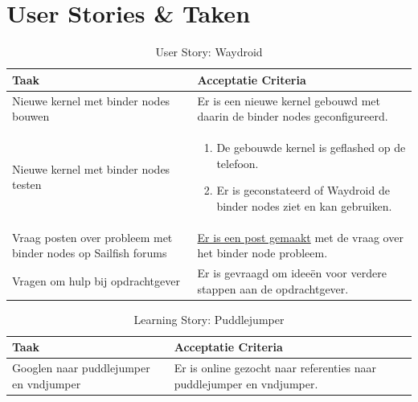 \documentclass[a4paper]{report}
\newcommand{\learningstorycolor}{PaleGreen1}
\newcommand{\userstorycolor}{PeachPuff1}
\begin{document}
\section{User Stories \& Taken}
\begin{tcolorbox}[colback=white, coltitle=black, colframe=\userstorycolor, title=\textbf{User Story: }Als developer wil ik Waydroid als package kunnen bouwen\, zodat er android apps op de telefoon gerund kunnen worden.]
  \begin{table}[H]
      \centering
    \begin{tabularx}{1\textwidth}{|X|X|}
      \hline
      \cellcolor[HTML]{ffcc99} \textbf{Taak} & \cellcolor[HTML]{ffcc99} \textbf{Acceptatie Criteria} \\ 
      \hline 
      Nieuwe kernel met binder nodes bouwen & Er is een nieuwe kernel gebouwd met daarin de binder nodes geconfigureerd. \\
      \hline
      Nieuwe kernel met binder nodes testen &  
      \begin{enumerate}[leftmargin=.4cm, topsep=0cm, itemsep=.2cm]
        \item De gebouwde kernel is geflashed op de telefoon.
        \item Er is geconstateerd of Waydroid de binder nodes ziet en kan gebruiken.
      \end{enumerate}\\ 
      \hline 
      Vraag posten over probleem met binder nodes op Sailfish forums & \href{https://forum.sailfishos.org/t/the-fairphone-4-thread/17543/2?u=dimac4455}{Er is een post gemaakt} met de vraag over het binder node probleem. \\
      \hline 
      Vragen om hulp bij opdrachtgever & Er is gevraagd om ideeën voor verdere stappen aan de opdrachtgever. \\
      \hline       
    \end{tabularx}
    \caption{User Story: Waydroid}
  \label{table:it6:story_waydroid}
  \end{table}
  \end{tcolorbox}
  
\begin{tcolorbox}[colback=white, coltitle=black, colframe=\learningstorycolor, title=\textbf{Learning Story: }Als developer wil ik weten wat puddlejumper en vndjumper is\, zodat ik kan begrijpen hoe ik de binder nodes moet configureren.]
  \begin{table}[H]
      \centering
    \begin{tabularx}{1\textwidth}{|X|X|}
      \hline
      \cellcolor[HTML]{ffcc99} \textbf{Taak} & \cellcolor[HTML]{ffcc99} \textbf{Acceptatie Criteria} \\ 
      \hline 
      Googlen naar puddlejumper en vndjumper & Er is online gezocht naar referenties naar puddlejumper en vndjumper. \\
      \hline
    \end{tabularx}
    \caption{Learning Story: Puddlejumper}
  \label{table:it6:story_puddlejumper}
  \end{table}
  \end{tcolorbox}
  
\end{document}
